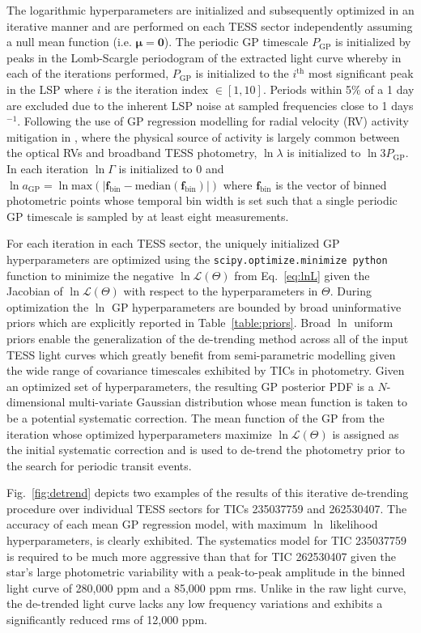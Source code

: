 The logarithmic hyperparameters are initialized and subsequently optimized in an iterative manner and
are performed on each TESS sector independently assuming a null mean function (i.e.
$\boldsymbol{\mu}=\mathbf{0}$).
The periodic GP timescale $P_{\text{GP}}$ is initialized by peaks in the Lomb-Scargle
periodogram \citep[LSP;][]{scargle82} of the extracted light curve whereby in each of the iterations
performed, $P_{\text{GP}}$ is initialized to the $i^{\text{th}}$ most significant peak in the LSP where $i$
is the iteration index $\in [1,10]$. Periods within 5\% of a 1 day are excluded due to the
inherent LSP noise at sampled frequencies close to 1 days$^{-1}$. Following the use of GP regression
modelling for radial velocity (RV) activity mitigation in \cite{dittmann17a}, where the physical source of
activity is largely common between the optical RVs and broadband TESS photometry,  
$\ln{\lambda}$ is initialized to $\ln{3P_{\text{GP}}}$. In each iteration $\ln{\Gamma}$ is initialized to
$0$ and $\ln{a_{\text{GP}}}=\ln{\text{max}(|\mathbf{f}_{\text{bin}} - \text{median}(\mathbf{f}_{\text{bin}})|)}$
where $\mathbf{f}_{\text{bin}}$ is the vector of binned photometric points whose temporal bin width is set
such that a single periodic GP timescale is sampled by at least eight measurements.

For each iteration in each TESS sector, the uniquely initialized GP hyperparameters are optimized
using the \texttt{scipy.optimize.minimize python} function to minimize the negative
$\ln{\mathcal{L}(\Theta)}$ from Eq.~\ref{eq:lnL}
given the Jacobian of $\ln{\mathcal{L}(\Theta)}$ with respect to the hyperparameters in
$\Theta$. During optimization the $\ln$ GP hyperparameters are bounded by broad uninformative priors
which are explicitly reported in Table~\ref{table:priors}. Broad $\ln$ uniform priors enable
the generalization of the \pipeline{} de-trending method across all of the input TESS light curves
which greatly benefit from semi-parametric modelling given the wide range of covariance timescales
exhibited by TICs in photometry.
Given an optimized set of hyperparameters, the resulting GP posterior PDF is a $N$-dimensional
multi-variate Gaussian distribution whose mean function is taken to be a potential systematic correction.
The mean function of the GP from the iteration whose optimized hyperparameters maximize
$\ln{\mathcal{L}(\Theta)}$ is assigned as the initial systematic
correction and is used to de-trend the photometry prior to the search for periodic transit events.

Fig.~\ref{fig:detrend} depicts two examples of the results of this iterative de-trending procedure over
individual TESS sectors for TICs 235037759 and 262530407. The accuracy of each mean GP regression model,
with maximum $\ln$ likelihood hyperparameters, is clearly exhibited. The systematics model for TIC 235037759
is required to be much more aggressive than that for TIC 262530407
given the star's large photometric variability with a peak-to-peak
amplitude in the binned light curve of 280,000 ppm and a 85,000 ppm rms. Unlike in the raw
light curve, the de-trended light curve lacks any low frequency variations and exhibits a significantly
reduced rms of 12,000 ppm.

